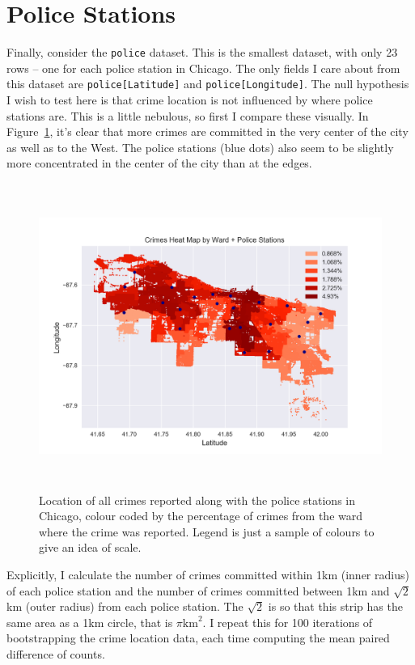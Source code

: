 \documentclass[11pt]{article}
\newcommand{\1}{\mathds{1}}
\def\code#1{\texttt{#1}}
\begin{document}
\section{Police Stations} \label{sec:police}

\noindent
Finally, consider the \code{police} dataset. This is the smallest dataset, with only 23 rows -- one for each police station in Chicago. The only fields I care about from this dataset are \code{police[Latitude]} and \code{police[Longitude]}.  The null hypothesis I wish to test here is that crime location is not influenced by where police stations are. This is a little nebulous, so first I compare these visually. In Figure~\ref{fig:location1}, it's clear that more crimes are committed in the very center of the city as well as to the West. The police stations (blue dots) also seem to be slightly more concentrated in the center of the city than at the edges. 

\begin{figure}[h]
	\centering
	\includegraphics[width=140mm, height=100mm]{crime_locations.png}
	\caption{Location of all crimes reported along with the police stations in Chicago, colour coded by the percentage of crimes from the ward where the crime was reported. Legend is just a sample of colours to give an idea of scale.}
	\label{fig:location1}
\end{figure}

Explicitly, I calculate the number of crimes committed within 1km (inner radius) of each police station and the number of crimes committed between 1km and $\sqrt{2}$km (outer radius) from each police station. The $\sqrt{2}$ is so that this strip has the same area as a 1km circle, that is $\pi\text{km}^2$. I repeat this for 100 iterations of bootstrapping the crime location data, each time computing the mean paired difference of counts.
\end{document}
